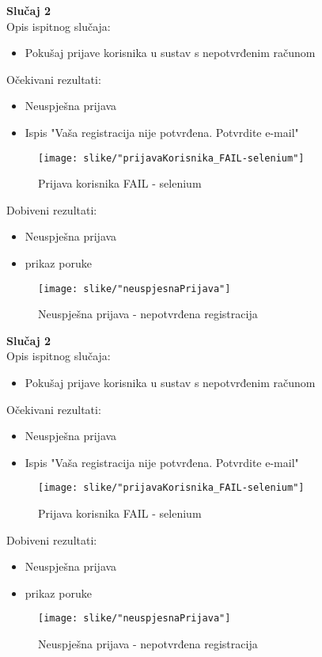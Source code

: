  					\textbf{Slučaj 2}\\
 					Opis ispitnog slučaja:
 					\begin{itemize}
 						\item Pokušaj prijave korisnika u sustav s nepotvrđenim računom
 					\end{itemize}
 					Očekivani rezultati:
 					\begin{itemize}
 						\setlength\itemsep{0.1em}
 						\item Neuspješna prijava
 						\item Ispis "Vaša registracija nije potvrđena. Potvrdite e-mail"
 					\end{itemize}
 					\begin{figure}[H]
 						\texttt{[image: slike/"prijavaKorisnika\_FAIL-selenium"]}
 						\centering
 						\caption{Prijava korisnika FAIL - selenium}
 						\label{neuspjesna prijava - selenium}
 					\end{figure}
 					Dobiveni rezultati:
 					\begin{itemize}
 						\setlength\itemsep{0.1em}
 						\item Neuspješna prijava
 						\item prikaz poruke
 					\end{itemize}
 					\begin{figure}[H]
 						\texttt{[image: slike/"neuspjesnaPrijava"]}
 						\centering
 						\caption{Neuspješna prijava - nepotvrđena registracija}
 						\label{neuspjesna prijava}
 					\end{figure}
			
			\eject 
			
			
			\textbf{Slučaj 2}\\
			Opis ispitnog slučaja:
			\begin{itemize}
				\item Pokušaj prijave korisnika u sustav s nepotvrđenim računom
			\end{itemize}
			Očekivani rezultati:
			\begin{itemize}
				\setlength\itemsep{0.1em}
				\item Neuspješna prijava
				\item Ispis "Vaša registracija nije potvrđena. Potvrdite e-mail"
			\end{itemize}
			\begin{figure}[H]
				\texttt{[image: slike/"prijavaKorisnika\_FAIL-selenium"]}
				\centering
				\caption{Prijava korisnika FAIL - selenium}
				\label{neuspjesna prijava - selenium}
			\end{figure}
			Dobiveni rezultati:
			\begin{itemize}
				\setlength\itemsep{0.1em}
				\item Neuspješna prijava
				\item prikaz poruke
			\end{itemize}
			\begin{figure}[H]
				\texttt{[image: slike/"neuspjesnaPrijava"]}
				\centering
				\caption{Neuspješna prijava - nepotvrđena registracija}
				\label{neuspjesna prijava}
			\end{figure}
			
